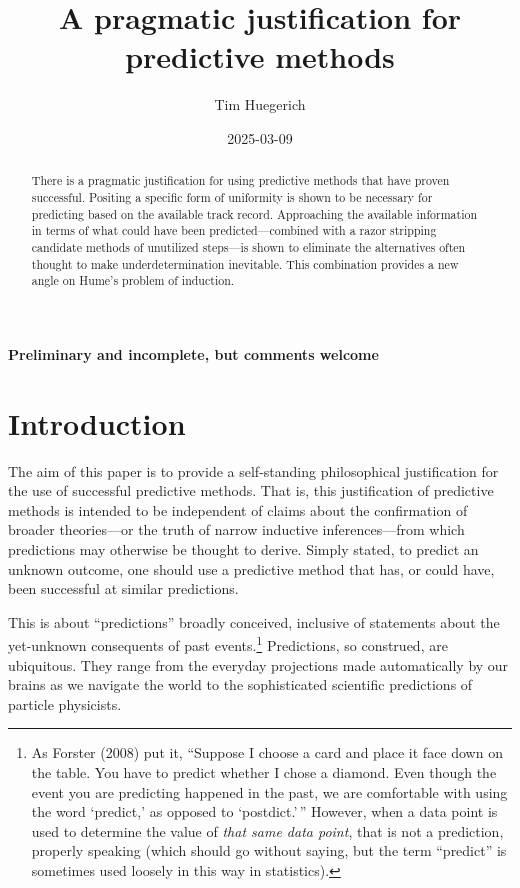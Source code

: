 \documentclass[
  letterpaper,
  DIV=11,
  numbers=noendperiod]{scrartcl}
\title{A pragmatic justification for predictive methods}
\author{Tim Huegerich}
\date{2025-03-09}
\theoremstyle{definition}
\theoremstyle{remark}
\begin{document}
\maketitle
\begin{abstract}
There is a pragmatic justification for using predictive methods that
have proven successful. Positing a specific form of uniformity is shown
to be necessary for predicting based on the available track record.
Approaching the available information in terms of what could have been
predicted---combined with a razor stripping candidate methods of
unutilized steps---is shown to eliminate the alternatives often thought
to make underdetermination inevitable. This combination provides a new
angle on Hume's problem of induction.
\end{abstract}


\textbf{Preliminary and incomplete, but comments welcome}

\section{Introduction}\label{introduction}

The aim of this paper is to provide a self-standing philosophical
justification for the use of successful predictive methods. That is,
this justification of predictive methods is intended to be independent
of claims about the confirmation of broader theories---or the truth of
narrow inductive inferences---from which predictions may otherwise be
thought to derive. Simply stated, to predict an unknown outcome, one
should use a predictive method that has, or could have, been successful
at similar predictions.

This is about ``predictions'' broadly conceived, inclusive of statements
about the yet-unknown consequents of past events.\footnote{As Forster
  (2008) put it, ``Suppose I choose a card and place it face down on the
  table. You have to predict whether I chose a diamond. Even though the
  event you are predicting happened in the past, we are comfortable with
  using the word `predict,' as opposed to `postdict.'\,'' However, when
  a data point is used to determine the value of \emph{that same data
  point}, that is not a prediction, properly speaking (which should go
  without saying, but the term ``predict'' is sometimes used loosely in
  this way in statistics).} Predictions, so construed, are ubiquitous.
They range from the everyday projections made automatically by our
brains as we navigate the world to the sophisticated scientific
predictions of particle physicists.
\end{document}
